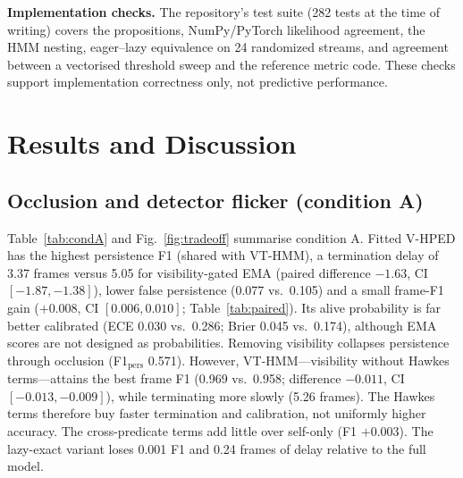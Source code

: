 \documentclass[conference]{IEEEtran}
\begin{document}
\textbf{Implementation checks.} The repository's test suite (282 tests at the time of
writing) covers the propositions, NumPy/PyTorch likelihood agreement, the HMM nesting,
eager--lazy equivalence on 24 randomized streams, and agreement between a vectorised
threshold sweep and the reference metric code. These checks support implementation
correctness only, not predictive performance.

\section{Results and Discussion}
\subsection{Occlusion and detector flicker (condition A)}
Table~\ref{tab:condA} and Fig.~\ref{fig:tradeoff} summarise condition A.
Fitted V-HPED has the highest persistence F1 (shared with VT-HMM), a termination delay of
3.37 frames versus 5.05 for visibility-gated EMA (paired difference $-1.63$, CI
$[-1.87,-1.38]$), lower false persistence (0.077 vs.\ 0.105) and a small frame-F1 gain
($+0.008$, CI $[0.006,0.010]$; Table~\ref{tab:paired}). Its alive probability is far
better calibrated (ECE 0.030 vs.\ 0.286; Brier 0.045 vs.\ 0.174), although EMA scores
are not designed as probabilities. Removing visibility collapses persistence through
occlusion (F1$_{\mathrm{pers}}$ 0.571). However, VT-HMM---visibility without Hawkes
terms---attains the best frame F1 (0.969 vs.\ 0.958; difference $-0.011$, CI
$[-0.013,-0.009]$), while terminating more slowly (5.26 frames). The Hawkes terms
therefore buy faster termination and calibration, not uniformly higher accuracy. The
cross-predicate terms add little over self-only (F1 $+0.003$). The lazy-exact variant
loses 0.001 F1 and 0.24 frames of delay relative to the full model.

\begin{table}[t]
\caption{Condition A (synthetic): occlusion + detector flicker. Test mean $\pm$ std over
5 seeds at the validation-selected threshold. No memory has trivially the shortest
delay because it never persists. Run \texttt{20261027\_202753\_a7314fe5}.}
\label{tab:condA}
\centering\scriptsize
\resizebox{\columnwidth}{!}{}
\end{table}

\begin{table}[t]
\caption{Paired differences, fitted V-HPED minus each method (positive $\Delta$F1 and
negative $\Delta$Delay favour V-HPED). 95\% bootstrap CIs over test videos.}
\label{tab:paired}
\centering\scriptsize
\resizebox{\columnwidth}{!}{}
\end{table}
\end{document}
